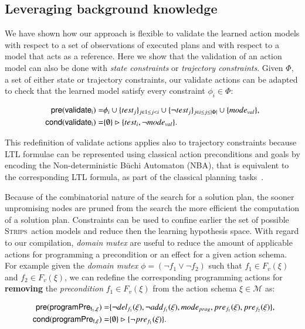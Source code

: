 \documentclass[3p,times]{elsarticle}
\newcommand{\pre}{\mathsf{pre}}  %
\newcommand{\cond}{\mathsf{cond}}   %
\newcommand{\strips}{\textsc{Strips}}     %
\begin{document}
\subsection{Leveraging background knowledge}
We have shown how our approach is flexible to validate the learned action models with respect to a set of observations of executed plans and with respect to a model that acts as a reference. Here we show that the validation of an action model can also be done with {\em state constraints} or {\em trajectory constraints}. Given $\Phi$, a set of either state or trajectory constraints, our validate actions can be adapted to check that the learned model satisfy every constraint $\phi_i\in\Phi$:
\begin{small}
\begin{align*}
\hspace*{7pt}\pre(\mathsf{validate_{i}})=&\phi_i\cup\{test_j\}_{j\in 1\leq j<i}\cup\{\neg test_j\}_{j\in i\leq j\leq |\Phi|}\cup \{mode_{val}\},\\
\cond(\mathsf{validate_{i}})=&\{\emptyset\}\rhd\{test_i,\neg mode_{val}\}.
\end{align*}
\end{small}

This redefinition of validate actions applies also to trajectory constraints because LTL formulae can be represented using classical action preconditions and goals by encoding the Non-deterministic B\"{u}chi Automaton (NBA), that is equivalent to the corresponding LTL formula, as part of the classical planning tasks~\cite{baier2006planning}.

Because of the combinatorial nature of the search for a solution plan, the sooner unpromising nodes are pruned from the search the more efficient the computation of a solution plan. Constraints can be used to confine earlier the set of possible \strips\ action models and reduce then the learning hypothesis space. With regard to our compilation, {\em domain mutex} are useful to reduce the amount of applicable actions for programming a precondition or an effect for a given action schema. For example given the {\em domain mutex} $\phi=(\neg f_1\vee \neg f_2)$ such that $f_1\in F_v(\xi)$ and $f_2\in F_v(\xi)$, we can redefine the corresponding programming actions for {\bf removing} the {\em precondition} $f_1\in F_v(\xi)$ from the action schema $\xi\in\mathcal{M}$ as:

\begin{small}
\begin{align*}
\hspace*{7pt}\pre(\mathsf{programPre_{f_1,\xi}})=&\{\neg del_{f_1}(\xi),\neg add_{f_1}(\xi), mode_{prog}, pre_{f_1}(\xi), pre_{f_2}(\xi)\},\\
\cond(\mathsf{programPre_{f,\xi}})=&\{\emptyset\}\rhd\{\neg pre_{f_1}(\xi)\}.
\end{align*}
\end{small}
\end{document}
